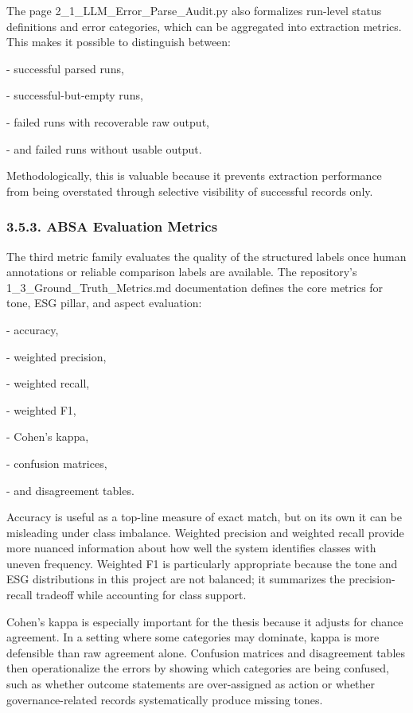 \documentclass{article}
\begin{document}
The page 2\_1\_LLM\_Error\_Parse\_Audit.py also formalizes run-level status definitions and error categories, which can be aggregated into extraction metrics. This makes it possible to distinguish between:

- successful parsed runs,

- successful-but-empty runs,

- failed runs with recoverable raw output,

- and failed runs without usable output.

Methodologically, this is valuable because it prevents extraction performance from being overstated through selective visibility of successful records only.
\subsubsection*{ 3.5.3. ABSA Evaluation Metrics}

The third metric family evaluates the quality of the structured labels once human annotations or reliable comparison labels are available. The repository’s 1\_3\_Ground\_Truth\_Metrics.md documentation defines the core metrics for tone, ESG pillar, and aspect evaluation:

- accuracy,

- weighted precision,

- weighted recall,

- weighted F1,

- Cohen’s kappa,

- confusion matrices,

- and disagreement tables.

Accuracy is useful as a top-line measure of exact match, but on its own it can be misleading under class imbalance. Weighted precision and weighted recall provide more nuanced information about how well the system identifies classes with uneven frequency. Weighted F1 is particularly appropriate because the tone and ESG distributions in this project are not balanced; it summarizes the precision-recall tradeoff while accounting for class support.

Cohen’s kappa is especially important for the thesis because it adjusts for chance agreement. In a setting where some categories may dominate, kappa is more defensible than raw agreement alone. Confusion matrices and disagreement tables then operationalize the errors by showing which categories are being confused, such as whether outcome statements are over-assigned as action or whether governance-related records systematically produce missing tones.
\end{document}
